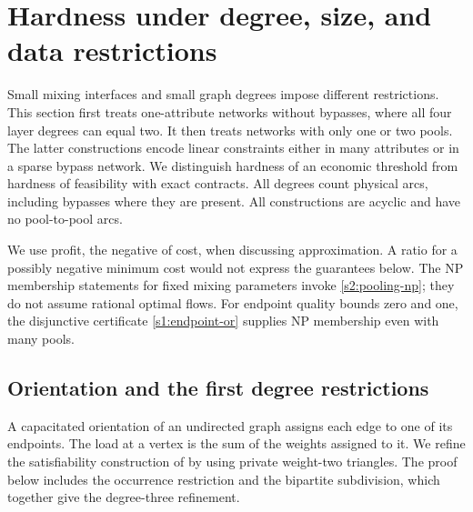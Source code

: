 \section{Hardness under degree, size, and data restrictions}\label{s3:hardness}

Small mixing interfaces and small graph degrees impose different restrictions.
This section first treats one-attribute networks without bypasses, where all
four layer degrees can equal two. It then treats networks with only one or
two pools. The latter constructions encode linear constraints either in
many attributes or in a sparse bypass network. We distinguish hardness of
an economic threshold from hardness of feasibility with exact contracts.
All degrees count physical arcs, including bypasses where they are present.
All constructions are acyclic and have no pool-to-pool arcs.

We use profit, the negative of cost, when discussing approximation. A ratio
for a possibly negative minimum cost would not express the guarantees below.
The NP membership statements for fixed mixing parameters invoke
\cref{s2:pooling-np}; they do not assume rational optimal flows. For
endpoint quality bounds zero and one, the disjunctive certificate
\eqref{s1:endpoint-or} supplies NP membership even with many pools.

\subsection{Orientation and the first degree restrictions}\label{s3:orientation}

A capacitated orientation of an undirected graph assigns each edge to one
of its endpoints. The load at a vertex is the sum of the weights assigned
to it. We refine the satisfiability construction of
\citet[Section~5]{s3:asahiro2011} by using private weight-two triangles.
The proof below includes the occurrence restriction and the bipartite
subdivision, which together give the degree-three refinement.

